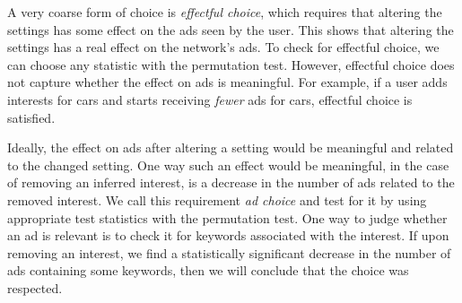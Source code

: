 \documentclass[10pt, onecolumn]{report}
\begin{document}
A very coarse form of choice is \emph{effectful choice}, 
which requires that altering the settings has some effect on the ads seen by the user. 
This shows that altering the settings has a real effect on the network's ads. 
To check for effectful choice, we can choose any statistic with the permutation test.
However, effectful choice does not capture whether the effect on 
ads is meaningful. For example, if a user adds interests for cars 
and starts receiving \emph{fewer} ads for cars, effectful choice is satisfied. 

Ideally, the effect on ads after altering a setting would be 
meaningful and related to the changed setting.
One way such an effect would be meaningful, in the case of removing 
an inferred interest, is a decrease in the number of ads related to the 
removed interest. %
We call this requirement \emph{ad choice} and test for it by using appropriate
test statistics with the permutation test. 
One way to judge whether an ad is relevant is to check it 
for keywords associated with the interest.  
If upon removing an interest, we find a statistically significant 
decrease in the number of ads containing some keywords, 
then we will conclude that the choice was respected.
\end{document}
